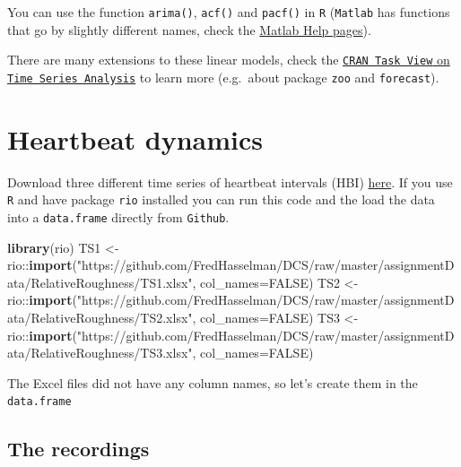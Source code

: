 \documentclass[]{book}
\newenvironment{Shaded}{\begin{snugshade}}{\end{snugshade}}
\newcommand{\KeywordTok}[1]{\textcolor[rgb]{0.13,0.29,0.53}{\textbf{{#1}}}}
\newcommand{\DataTypeTok}[1]{\textcolor[rgb]{0.13,0.29,0.53}{{#1}}}
\newcommand{\StringTok}[1]{\textcolor[rgb]{0.31,0.60,0.02}{{#1}}}
\newcommand{\OtherTok}[1]{\textcolor[rgb]{0.56,0.35,0.01}{{#1}}}
\newcommand{\NormalTok}[1]{{#1}}
\let\stdsection\section
\renewcommand\section{\newpage\stdsection}
\begin{document}
You can use the function \texttt{arima()}, \texttt{acf()} and
\texttt{pacf()} in \texttt{R} (\texttt{Matlab} has functions that go by
slightly different names, check the
\href{https://nl.mathworks.com/help/econ/autocorr.html}{Matlab Help
pages}).

There are many extensions to these linear models, check the
\href{https://cran.r-project.org/web/views/TimeSeries.html}{\texttt{CRAN\ Task\ View}
on \texttt{Time\ Series\ Analysis}} to learn more (e.g.~about package
\texttt{zoo} and \texttt{forecast}).

\section{Heartbeat dynamics}\label{heartbeat-dynamics}

Download three different time series of heartbeat intervals (HBI)
\href{https://github.com/FredHasselman/DCS/tree/master/assignmentData/RelativeRoughness}{here}.
If you use \texttt{R} and have package \texttt{rio} installed you can
run this code and the load the data into a \texttt{data.frame} directly
from \texttt{Github}.

\begin{Shaded}
\begin{Highlighting}[]
\KeywordTok{library}\NormalTok{(rio)}
\NormalTok{TS1 <-}\StringTok{ }\NormalTok{rio::}\KeywordTok{import}\NormalTok{(}\StringTok{"https://github.com/FredHasselman/DCS/raw/master/assignmentData/RelativeRoughness/TS1.xlsx"}\NormalTok{, }\DataTypeTok{col_names=}\OtherTok{FALSE}\NormalTok{)}
\NormalTok{TS2 <-}\StringTok{ }\NormalTok{rio::}\KeywordTok{import}\NormalTok{(}\StringTok{"https://github.com/FredHasselman/DCS/raw/master/assignmentData/RelativeRoughness/TS2.xlsx"}\NormalTok{, }\DataTypeTok{col_names=}\OtherTok{FALSE}\NormalTok{)}
\NormalTok{TS3 <-}\StringTok{ }\NormalTok{rio::}\KeywordTok{import}\NormalTok{(}\StringTok{"https://github.com/FredHasselman/DCS/raw/master/assignmentData/RelativeRoughness/TS3.xlsx"}\NormalTok{, }\DataTypeTok{col_names=}\OtherTok{FALSE}\NormalTok{)}
\end{Highlighting}
\end{Shaded}

The Excel files did not have any column names, so let's create them in
the \texttt{data.frame}

\subsection{The recordings}\label{the-recordings}
\end{document}
